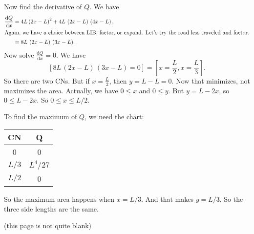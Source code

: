 \documentclass[12pt,fleqn,answers]{exam}
\begin{document}
\begin{questions}
\begin{solution}
   Now find the derivative of $Q$. We have
    \begin{align*}
      \frac{\mathrm{d} Q}{\mathrm{d} x}   &= 4 L\, {{\left( 2 x-L\right) }^{2}}+4 L\, \left( 2 x-L\right) \, \left( 4 x-L\right) ,\\
      \intertext{Again, we have a choice between LIB, factor, or expand. 
      Let's try the road less traveled and factor.}
                                                              &= 8 L\, \left( 2 x-L\right) \, \left( 3 x-L\right).
   \end{align*}   
   Now solve $\displaystyle \frac{\mathrm{d} Q}{\mathrm{d} x} = 0$. We have
   \begin{equation}
   \left[ 8 L\, \left( 2 x-L\right) \, \left( 3 x-L\right) = 0 \right] = \left[ x = \frac{L}{2}, x = \frac{L}{3} \right].
   \end{equation}
   So there are two CNs.  But if $x=  \frac{L}{2}$, then $y = L - L = 0$. Now that minimizes, not maximizes the area.  Actually, we have
   $0 \leq x$ and $0 \leq y$. But $y = L - 2 x$, so  $0 \leq L - 2 x$. So $0 \leq x \leq L/2$. 
  
  To find the maximum of $Q$, we need the chart:
   \begin{center}
\begin{tabular}{|c|c|} \hline 
    CN & Q \\ \hline \hline
    0  & 0 \\
    $L/3$ & $L^{4}/27$ \\
    $L/2$ & 0 \\ \hline
\end{tabular}
\end{center}
So the maximum area happens when $x = L/3$. And that makes $y = L/3$.
So the three side lengths are the same.
\end{solution}

   (this page is not quite blank)

\end{questions}
\end{document}
